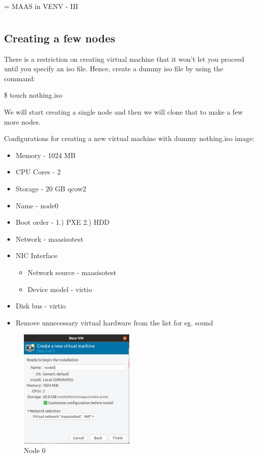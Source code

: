 \chapname = {MAAS in VENV - III}

\chapter{\the\chapname}

\section{Creating a few nodes}

There is a restriction on creating virtual machine that it won't let you proceed until you specify an iso file. Hence, create a dummy iso file by using the command: 

\$ touch nothing.iso

We will start creating a single node and then we will clone that to make a few more nodes.

Configurations for creating a new virtual machine with dummy nothing.iso image:

\begin{itemize}
    \setlength\itemsep{0em}
    \item Memory - 1024 MB
    \item CPU Cores - 2
    \item Storage - 20 GB qcow2 
    \item Name - node0
    \item Boot order - 1.) PXE  2.) HDD
    \item Network - maasisotest
    \item NIC Interface 
    \begin{itemize}
        \item Network source - maasisotest
        \item Device model - virtio
    \end{itemize}
    \item Disk bus - virtio
    \item Remove unnecessary virtual hardware from the list for eg. sound
\end{itemize}

\begin{figure}[!ht]
    \centering
    \includegraphics[width=0.5\textwidth]{images/5-1.png}
    \caption{Node 0}
\end{figure}


